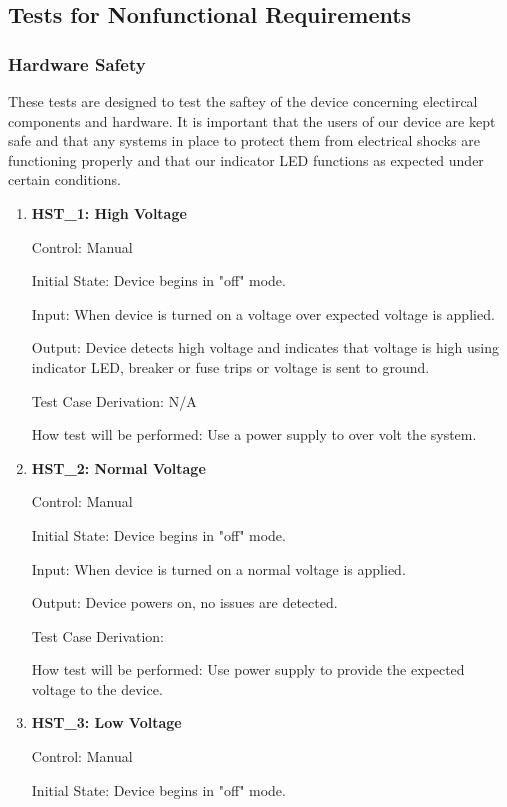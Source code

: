 \documentclass[12pt, titlepage]{article}
\begin{document}
\subsection{Tests for Nonfunctional Requirements}
\subsubsection{Hardware Safety }

These tests are designed to test the saftey of the device concerning electircal components and hardware. It is important that the users of our device are kept safe and that any systems in place to protect them from electrical shocks are functioning properly and that our indicator LED functions as expected under certain conditions.

\begin{enumerate}

\item{\textbf{HST\_1: High Voltage}}\label{HST1}

Control: Manual 

Initial State: Device begins in "off" mode.

Input: When device is turned on a voltage over expected voltage is applied.

Output: Device detects high voltage and indicates that voltage is high using indicator LED, breaker or fuse trips or voltage is sent to ground.

Test Case Derivation: N/A

How test will be performed: Use a power supply to over volt the system. 

\item{\textbf{HST\_2: Normal Voltage}}\label{HST2}

Control: Manual

Initial State: Device begins in "off" mode.

Input: When device is turned on a normal voltage is applied.

Output: Device powers on, no issues are detected.

Test Case Derivation:

How test will be performed: Use power supply to provide the expected voltage to the device.

\item{\textbf{HST\_3: Low Voltage}}\label{HST3}

Control: Manual

Initial State: Device begins in "off" mode.


\end{enumerate}
\end{document}
